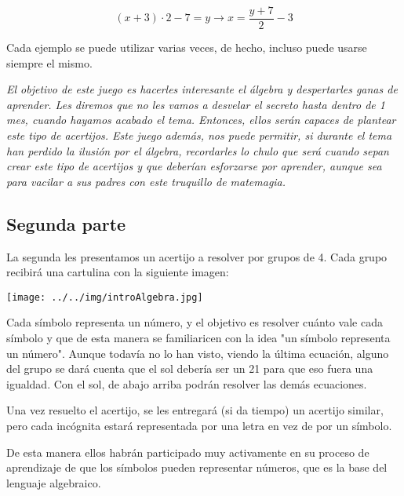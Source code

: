 \[
(x + 3)·2 - 7 = y \to x = \frac{y+7}{2} - 3
\]


Cada ejemplo se puede utilizar varias veces, de hecho, incluso puede usarse siempre el mismo.

\textit{El objetivo de este juego es hacerles interesante el álgebra y despertarles  ganas de aprender.
%
Les diremos que no les vamos a desvelar el secreto hasta dentro de 1 mes, cuando hayamos acabado el tema.
%
Entonces, ellos serán capaces de plantear este tipo de acertijos.
%
Este juego además, nos puede permitir, si durante el tema han perdido la ilusión por el álgebra, recordarles lo chulo que será cuando sepan crear este tipo de acertijos y que deberían esforzarse por aprender, aunque sea para vacilar a sus padres con este truquillo de matemagia.
}

\newpage

\subsection{Segunda parte}

La segunda les presentamos un acertijo a resolver por grupos de 4. Cada grupo recibirá una cartulina con la siguiente imagen:

\begin{center}
\texttt{[image: ../../img/introAlgebra.jpg]}
\end{center}

Cada símbolo representa un número, y el objetivo es resolver cuánto vale cada símbolo y que de esta manera se familiaricen con la idea "un símbolo representa un número".
%
Aunque todavía no lo han visto, viendo la última ecuación, alguno del grupo se dará cuenta que el sol debería ser un 21 para que eso fuera una igualdad. Con el sol, de abajo arriba podrán resolver las demás ecuaciones.


Una vez resuelto el acertijo, se les entregará (si da tiempo) un acertijo similar, pero cada incógnita estará representada por una letra en vez de por un símbolo.


De esta manera ellos habrán participado muy activamente en su proceso de aprendizaje de que los símbolos pueden representar números, que es la base del lenguaje algebraico.

